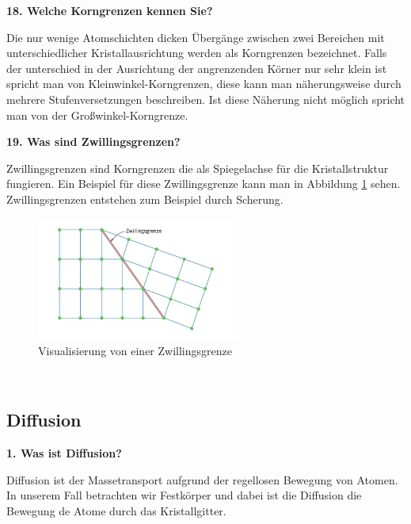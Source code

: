 \noindent\textbf{18. Welche Korngrenzen kennen Sie?}\\
\begin{addmargin}[25pt]{0pt}    
Die nur wenige Atomschichten dicken Übergänge zwischen zwei Bereichen mit unterschiedlicher Kristallausrichtung werden als Korngrenzen bezeichnet. Falls der unterschied in der Ausrichtung der angrenzenden Körner nur sehr klein ist spricht man von Kleinwinkel-Korngrenzen, diese kann man näherungsweise durch mehrere Stufenversetzungen beschreiben. Ist diese Näherung nicht möglich spricht man von der Großwinkel-Korngrenze. \\
\end{addmargin}

\noindent\textbf{19. Was sind Zwillingsgrenzen?}\\
\begin{addmargin}[25pt]{0pt}    
Zwillingsgrenzen sind Korngrenzen die als Spiegelachse für die Kristallstruktur fungieren. Ein Beispiel für diese Zwillingsgrenze kann man in Abbildung \ref{fig:Zwillingsgrenze} sehen. Zwillingsgrenzen entstehen zum Beispiel durch Scherung. 
\begin{figure}[h]
    \centering
    \includegraphics[width = 0.6\textwidth]{images/Materialwissenschaften/Zwillingsgrenze.jpeg}
    \caption{Visualisierung von einer Zwillingsgrenze}
    \label{fig:Zwillingsgrenze}
\end{figure}\\
\end{addmargin}



\subsection{Diffusion}
\noindent\textbf{1. Was ist Diffusion?}\\
\begin{addmargin}[25pt]{0pt}
Diffusion ist der Massetransport aufgrund der regellosen Bewegung von Atomen. In unserem Fall betrachten wir Festkörper und dabei ist die Diffusion die Bewegung de Atome durch das Kristallgitter.\\
\end{addmargin} 


